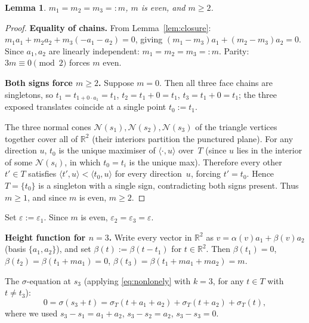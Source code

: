 \documentclass{article}
\newtheorem{lemma}{Lemma}
\begin{document}
\begin{lemma}\label{lem:n3m}
$m_1=m_2=m_3=:m$, $m$ is even, and $m\ge 2$.
\end{lemma}
\begin{proof}
\textbf{Equality of chains.}
From Lemma~\ref{lem:closure}: $m_1 a_1+m_2 a_2+m_3(-a_1-a_2)=0$, giving
$(m_1-m_3)a_1+(m_2-m_3)a_2=0$.
Since $a_1,a_2$ are linearly independent: $m_1=m_2=m_3=:m$.
Parity: $3m\equiv 0\pmod 2$ forces $m$ even.

\textbf{Both signs force $m\ge 2$.}
Suppose $m=0$.  Then all three face chains are singletons, so
$t_1=t_{1+0\cdot a_1}=t_1$, $t_2=t_1+0=t_1$, $t_3=t_1+0=t_1$; the three exposed
translates coincide at a single point $t_0:=t_1$.

The three normal cones $\mathcal{N}(s_1),\mathcal{N}(s_2),\mathcal{N}(s_3)$ of the triangle
vertices together cover all of $\mathbb{R}^2$ (their interiors partition the punctured plane).
For any direction $u$, $t_0$ is the unique maximiser of $\langle\cdot,u\rangle$ over~$T$
(since $u$ lies in the interior of some $\mathcal{N}(s_i)$, in which $t_0=t_i$ is the unique max).
Therefore every other $t'\in T$ satisfies $\langle t',u\rangle<\langle t_0,u\rangle$ for every
direction~$u$, forcing $t'=t_0$.
Hence $T=\{t_0\}$ is a singleton with a single sign, contradicting both signs present.
Thus $m\ge 1$, and since $m$ is even, $m\ge 2$.
\end{proof}

Set $\varepsilon:=\varepsilon_1$.  Since $m$ is even, $\varepsilon_2=\varepsilon_3=\varepsilon$.

\medskip
\noindent\textbf{Height function for $n=3$.}
Write every vector in $\mathbb{R}^2$ as $v=\alpha(v)a_1+\beta(v)a_2$ (basis $\{a_1,a_2\}$),
and set $\beta(t):=\beta(t-t_1)$ for $t\in\mathbb{R}^2$.
Then $\beta(t_1)=0$, $\beta(t_2)=\beta(t_1+ma_1)=0$, $\beta(t_3)=\beta(t_1+ma_1+ma_2)=m$.

The $\sigma$-equation at $s_3$ (applying \eqref{eq:nonlonely} with $k=3$, for
any $t\in T$ with $t\ne t_3$):
\begin{equation}\label{eq:s3}
  0 = \sigma(s_3+t)
    = \sigma_T(t+a_1+a_2)+\sigma_T(t+a_2)+\sigma_T(t),
\end{equation}
where we used $s_3-s_1=a_1+a_2$, $s_3-s_2=a_2$, $s_3-s_3=0$.
\end{document}
